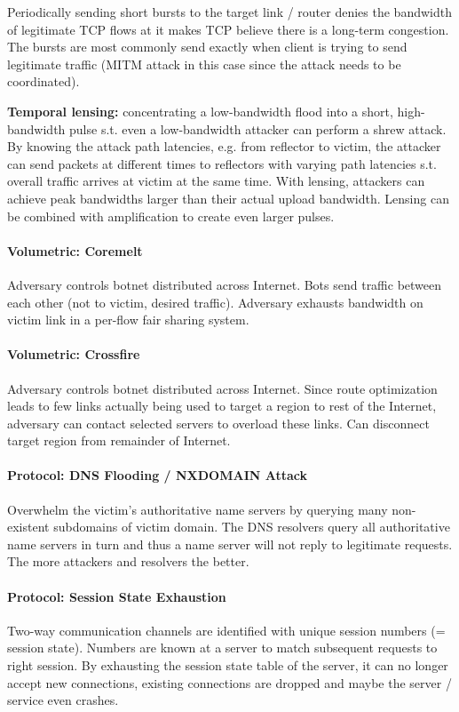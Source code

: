 Periodically sending short bursts to the target link / router denies the bandwidth of legitimate TCP flows at it makes TCP believe there is a long-term congestion. The bursts are most commonly send exactly when client is trying to send legitimate traffic (MITM attack in this case since the attack needs to be coordinated).

\textbf{Temporal lensing:} concentrating a low-bandwidth flood into a short, high-bandwidth pulse s.t. even a low-bandwidth attacker can perform a shrew attack. By knowing the attack path latencies, e.g. from reflector to victim, the attacker can send packets at different times to reflectors with varying path latencies s.t. overall traffic arrives at victim at the same time. With lensing, attackers can achieve peak bandwidths larger than their actual upload bandwidth. Lensing can be combined with amplification to create even larger pulses.

\paragraph{Volumetric: Coremelt}
Adversary controls botnet distributed across Internet. Bots send traffic between each other (not to victim, desired traffic). Adversary exhausts bandwidth on victim link in a per-flow fair sharing system.

\paragraph{Volumetric: Crossfire}
Adversary controls botnet distributed across Internet. Since route optimization leads to few links actually being used to target a region to rest of the Internet, adversary can contact selected servers to overload these links. Can disconnect target region from remainder of Internet.

\paragraph{Protocol: DNS Flooding / NXDOMAIN Attack}
Overwhelm the victim's authoritative name servers by querying many non-existent subdomains of victim domain. The DNS resolvers query all authoritative name servers in turn and thus a name server will not reply to legitimate requests. The more attackers and resolvers the better.

\paragraph{Protocol: Session State Exhaustion}
Two-way communication channels are identified with unique session numbers (= session state). Numbers are known at a server to match subsequent requests to right session. By exhausting the session state table of the server, it can no longer accept new connections, existing connections are dropped and maybe the server / service even crashes.

